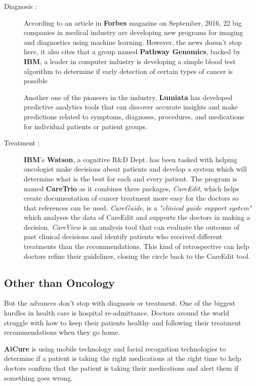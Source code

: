 \begin{description}
	\item[Diagnosis :]
	According to an article in \textbf{Forbes} magazine on September, 2016, 22 big companies in medical industry are developing new programs for imaging and diagnostics using machine learning. However, the news doesn't stop here, it also cites that a group named \textbf{Pathway Genomics}, backed by \textbf{IBM}, a leader in computer industry is developing a simple blood test algorithm to determine if early detection of certain types of cancer is possible
	
	Another one of the pioneers in the industry, \textbf{Lumiata} has developed predictive analytics tools that can discover accurate insights and make predictions related to symptoms, diagnoses, procedures, and medications for individual patients or patient groups.
	\item[Treatment :]
	\textbf{IBM}'s \textbf{Watson}, a cognitive R\&D Dept. has been tasked with helping oncologist make decisions about patients and develop a system which will determine what is the best for each and every patient. The program is named \textbf{CareTrio} as it combines three packages, \textit{CareEdit}, which helps create documentation of cancer treatment more easy for the doctors so that references can be used. \textit{CareGuide}, is a \emph{"clinical guide support system"} which analyses the data of CareEdit and supports the doctors in making a decision.  \textit{CareView} is an analysis tool that can evaluate the outcome of past clinical decisions and identify patients who received different treatments than the recommendations. This kind of retrospective can help doctors refine their guidelines, closing the circle back to the CareEdit tool.
\end{description}
\subsection{Other than Oncology}
But the advances don’t stop with diagnosis or treatment. One of the biggest hurdles in health care is hospital re-admittance. Doctors around the world struggle with how to keep their patients healthy and following their treatment recommendations when they go home.

\textbf{AiCure} is using mobile technology and facial recognition technologies to determine if a patient is taking the right medications at the right time to help doctors confirm that the patient is taking their medications and alert them if something goes wrong.

